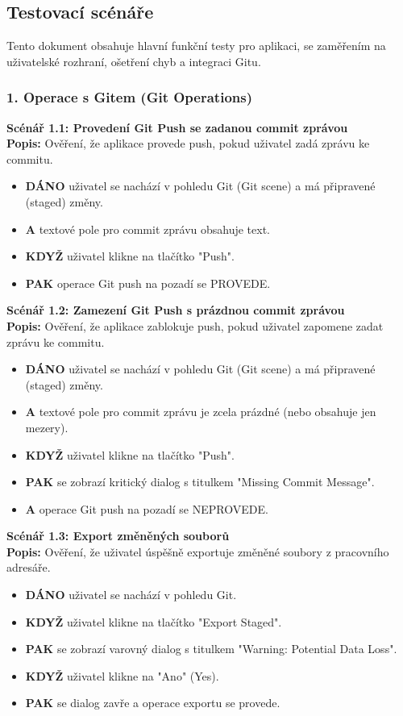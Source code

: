 \documentclass[12pt, a4paper]{article}
\begin{document}
\clearpage
\restoregeometry

\subsection{Testovací scénáře}
\label{app:scenare}

Tento dokument obsahuje hlavní funkční testy pro aplikaci, se zaměřením na uživatelské rozhraní, ošetření chyb a integraci Gitu.

\subsubsection*{1. Operace s Gitem (Git Operations)}

\textbf{Scénář 1.1: Provedení Git Push se zadanou commit zprávou} \\
\textbf{Popis:} Ověření, že aplikace provede push, pokud uživatel zadá zprávu ke commitu.
\begin{itemize}
    \item \textbf{DÁNO} uživatel se nachází v pohledu Git (Git scene) a má připravené (staged) změny.
    \item \textbf{A} textové pole pro commit zprávu obsahuje text.
    \item \textbf{KDYŽ} uživatel klikne na tlačítko "Push".
    \item \textbf{PAK} operace Git push na pozadí se PROVEDE.
\end{itemize}

\textbf{Scénář 1.2: Zamezení Git Push s prázdnou commit zprávou} \\
\textbf{Popis:} Ověření, že aplikace zablokuje push, pokud uživatel zapomene zadat zprávu ke commitu.
\begin{itemize}
    \item \textbf{DÁNO} uživatel se nachází v pohledu Git (Git scene) a má připravené (staged) změny.
    \item \textbf{A} textové pole pro commit zprávu je zcela prázdné (nebo obsahuje jen mezery).
    \item \textbf{KDYŽ} uživatel klikne na tlačítko "Push".
    \item \textbf{PAK} se zobrazí kritický dialog s titulkem "Missing Commit Message".
    \item \textbf{A} operace Git push na pozadí se NEPROVEDE.
\end{itemize}

\textbf{Scénář 1.3: Export změněných souborů} \\
\textbf{Popis:} Ověření, že uživatel úspěšně exportuje změněné soubory z pracovního adresáře.
\begin{itemize}
    \item \textbf{DÁNO} uživatel se nachází v pohledu Git.
    \item \textbf{KDYŽ} uživatel klikne na tlačítko "Export Staged".
    \item \textbf{PAK} se zobrazí varovný dialog s titulkem "Warning: Potential Data Loss".
    \item \textbf{KDYŽ} uživatel klikne na "Ano" (Yes).
    \item \textbf{PAK} se dialog zavře a operace exportu se provede.
\end{itemize}
\end{document}
